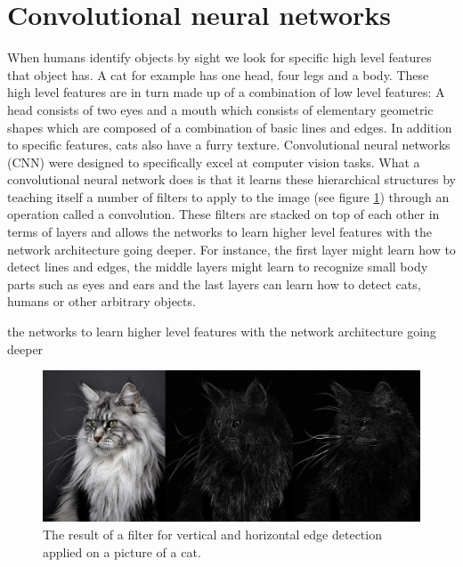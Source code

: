 \documentclass[a4paper, twoside]{article}
\begin{document}
\section{Convolutional neural networks}
When humans identify objects by sight we look for specific high level features that object has. A cat for example has one head, four legs and a body. These high level features are in turn made up of a combination of low level features: A head consists of two eyes and a mouth which consists of elementary geometric shapes which are composed of a combination of basic lines and edges. In addition to specific features, cats also have a furry texture. Convolutional neural networks (CNN) were designed to specifically excel at computer vision tasks. What a convolutional neural network does is that it learns these hierarchical structures by teaching itself a number of filters to apply to the image (see figure \ref{figkatter}) through an operation called a convolution. These filters are stacked on top of each other in terms of layers and allows the networks to learn higher level features with the network architecture going deeper. For instance, the first layer might learn how to detect lines and edges, the middle layers might learn to recognize small body parts such as eyes and ears and the last layers can learn how to detect cats, humans or other arbitrary objects. \cite{cs231n}

the networks to learn higher level features with the network architecture going deeper
\begin{figure}[h]
	\centering
  		\includegraphics[scale=0.33]{katter.png}
  	\caption{The result of a filter for vertical and horizontal edge detection applied on a picture of a cat.} \label{figkatter}
\end{figure}
\end{document}
